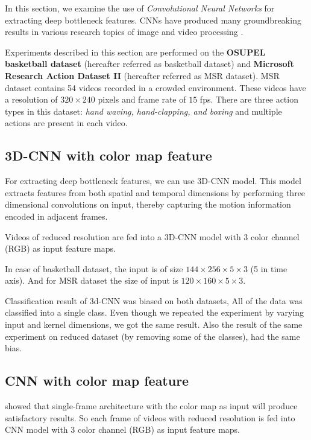 In this section, we examine the use of \textit{Convolutional Neural Networks} for extracting deep bottleneck features. CNNs have produced many groundbreaking results in various research topics of image and video processing \citep{KarpathyCVPR14, ji20133d, krizhevsky2012imagenet}. 

Experiments described in this section are performed on the \textbf{OSUPEL basketball dataset} \cite{brendel2011probabilistic} (hereafter referred as basketball dataset) and \textbf{Microsoft Research Action Dataset \RN{2}} (hereafter referred as MSR dataset). MSR dataset contains 54 videos recorded in a crowded environment. These videos have a resolution of $320 \times 240$ pixels and frame rate of $15$ fps. There are three action types in this dataset: \textit{hand waving, hand-clapping, and boxing } and multiple actions are present in each video.

\subsection{3D-CNN with color map feature}
For extracting deep bottleneck features, we can use 3D-CNN model. This model extracts features from both spatial and temporal dimensions by performing three dimensional convolutions on input, thereby capturing the motion information encoded in adjacent frames\citep{ji20133d}.

Videos of reduced resolution are fed into a 3D-CNN model with 3 color channel (RGB) as input feature maps. 

In case of basketball dataset, the input is of size $144 \times 256 \times 5 \times 3$ (5 in time axis). And for MSR dataset the size of input is $120 \times 160 \times 5 \times 3$.

Classification result of 3d-CNN was biased on both datasets, All of the data was classified into a single class. Even though we repeated the experiment by varying input and kernel dimensions, we got the same result. Also the result of the same experiment on reduced dataset (by removing some of the classes), had the same bias. 

\subsection{CNN with color map feature}
\citet{KarpathyCVPR14} showed that single-frame architecture with the color map as input will produce satisfactory results. So each frame of videos with reduced resolution is fed into CNN model with 3 color channel (RGB) as input feature maps.

